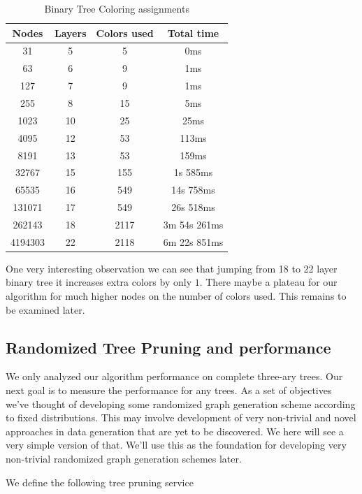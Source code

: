 \documentclass{article}
\theoremstyle{remark}
\begin{document}
\begin{table}[h]
    \centering
    \begin{tabular}{|c|c|c|c|}
        \hline
        \textbf{Nodes} & \textbf{Layers} & \textbf{Colors used} & \textbf{Total time} \\ \hline
        31 & 5 & 5 & 0ms \\ \hline
        63 & 6 & 9 & 1ms \\ \hline
        127 & 7 & 9 & 1ms \\ \hline
        255 & 8 & 15 & 5ms \\ \hline
        1023 & 10 & 25 & 25ms \\ \hline
        4095 & 12 & 53 & 113ms \\ \hline
        8191 & 13 & 53 & 159ms \\ \hline
        32767 & 15 & 155 & 1s 585ms \\ \hline
        65535 & 16 & 549 & 14s 758ms \\ \hline
        131071 & 17 & 549 & 26s 518ms \\ \hline
        262143 & 18 & 2117 & 3m 54s 261ms \\ \hline
        4194303 & 22 & 2118 & 6m 22s 851ms \\ \hline
    \end{tabular}
    \caption{Binary Tree Coloring assignments}
    \label{tab:data_2}
\end{table}

One very interesting observation we can see that jumping from 18 to 22 layer binary tree it increases extra colors by only $1$. There maybe a plateau for our algorithm for much higher nodes on the number of colors used. This remains to be examined later.


\subsection{Randomized Tree Pruning and performance}
We only analyzed our algorithm performance on complete three-ary trees. Our next goal is to measure the performance for any trees. As a set of objectives we've thought of developing some randomized graph generation scheme according to fixed distributions. This may involve development of very non-trivial and novel approaches in data generation that are yet to be discovered. We here will see a very simple version of that. We'll use this as the foundation for developing very non-trivial randomized graph generation schemes later.

We define the following tree pruning service
\end{document}
